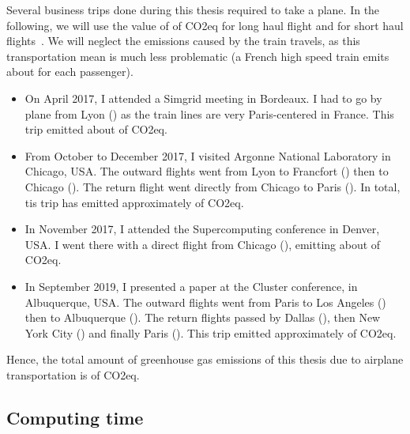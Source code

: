         Several business trips done during this thesis required to take a plane. In the following, we will use the value
        of  of CO2eq for long haul flight and  for short haul
        flights~\cite{co2_flight}. We will neglect the emissions caused by the train travels, as this transportation
        mean is much less problematic (a French high speed train emits about  for each
        passenger).
        \begin{itemize}
            \item On April 2017, I attended a Simgrid meeting in Bordeaux. I had to go by plane from Lyon
                () as the train lines are very Paris-centered in France. This trip emitted about
                 of CO2eq.
            \item From October to December 2017, I visited Argonne National Laboratory in Chicago, USA. The outward
                flights went from Lyon to Francfort () then to Chicago ().
                The return flight went directly from Chicago to Paris ().  In total, tis trip has
                emitted approximately  of CO2eq.
            \item In November 2017, I attended the Supercomputing conference in Denver, USA. I went there with a direct
                flight from Chicago (), emitting about  of CO2eq.
            \item In September 2019, I presented a paper at the Cluster conference, in Albuquerque, USA. The outward
                flights went from Paris to Los Angeles () then to Albuquerque
                (). The return flights passed by Dallas (), then New York
                City () and finally Paris (). This trip emitted
                approximately  of CO2eq.
        \end{itemize}
        Hence, the total amount of greenhouse gas emissions of this thesis due to airplane transportation is
         of CO2eq.

    \subsection*{Computing time}%

